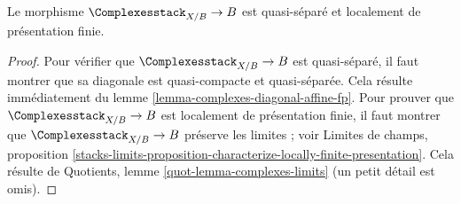 \begin{lemma}
\label{lemma-complexes-qs-lfp}
Le morphisme $\Complexesstack_{X/B} \to B$ est quasi-séparé et localement
de présentation finie.
\end{lemma}

\begin{proof}
Pour vérifier que $\Complexesstack_{X/B} \to B$ est quasi-séparé, il faut
montrer que sa diagonale est quasi-compacte et quasi-séparée.
Cela résulte immédiatement du lemme
\ref{lemma-complexes-diagonal-affine-fp}.
Pour prouver que $\Complexesstack_{X/B} \to B$ est localement de
présentation finie, il faut montrer que $\Complexesstack_{X/B} \to B$
préserve les limites ; voir Limites de champs, proposition
\ref{stacks-limits-proposition-characterize-locally-finite-presentation}.
Cela résulte de Quotients, lemme \ref{quot-lemma-complexes-limits}
(un petit détail est omis).
\end{proof}







































